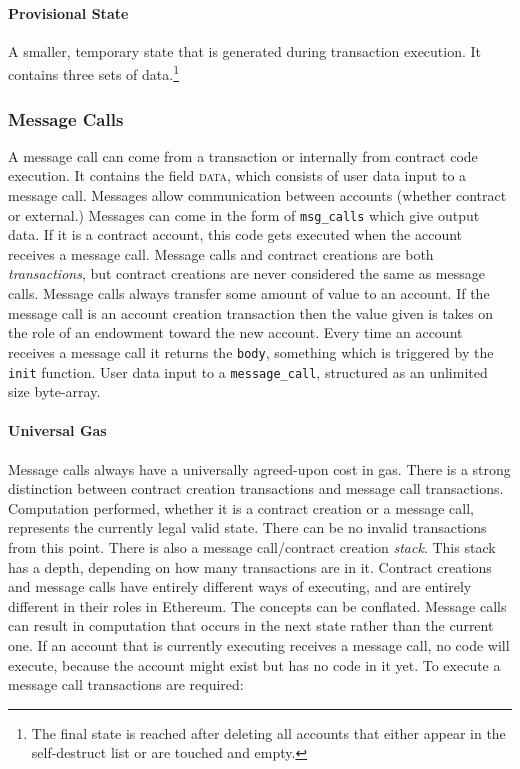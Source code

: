 \documentclass[10pt,letterpaper,leqno,bibliography=totoc]{scrartcl}
\newenvironment{alphafootnotes}
{\par\edef\savedfootnotenumber{\number\value{footnote}}
\renewcommand{\thefootnote}{\alph{footnote}}
\setcounter{footnote}{0}}
{\par\setcounter{footnote}{\savedfootnotenumber}}
\begin{document}
\begin{alphafootnotes}
\begin{multicols*}{2}
				\paragraph{Provisional State}
				A smaller, temporary state that is generated during transaction execution. It contains three sets of data.\footnote{The final state is reached after deleting all accounts that either appear in the self-destruct list or are touched and empty.}

			\subsubsection{Message Calls}
			A message call can come from a transaction or internally from contract code execution. It contains the field \textsc{data}, which consists of user data input to a message call. Messages allow communication between accounts (whether contract or external.) Messages can come in the form of \texttt{msg\_calls} which give output data. If it is a contract account, this code gets executed when the account receives a message call. Message calls and contract creations are both \textsl{transactions}, but contract creations are never considered the same as message calls. Message calls always transfer some amount of value to an account. If the message call is an account creation transaction then the value given is takes on the role of an endowment toward the new account. Every time an account receives a message call it returns the \texttt{body}, something which is triggered by the \texttt{init} function. User data input to a \texttt{message\_call}, structured as an unlimited size byte-array.

\paragraph{Universal Gas}Message calls always have a universally agreed-upon cost in gas. There is a strong distinction between contract creation transactions and message call transactions. Computation performed, whether it is a contract creation or a message call, represents the currently legal valid state. There can be no invalid transactions from this point. \supercite{Wood2017} There is also a message call/contract creation \textit{stack}. This stack has a depth, depending on how many transactions are in it. Contract creations and message calls have entirely different ways of executing, and are entirely different in their roles in Ethereum. The concepts can be conflated. Message calls can result in computation that occurs in the next state rather than the current one. If an account that is currently executing receives a message call, no code will execute, because the account might exist but has no code in it yet. To execute a message call transactions are required:


\end{multicols*}
\end{alphafootnotes}
\end{document}
